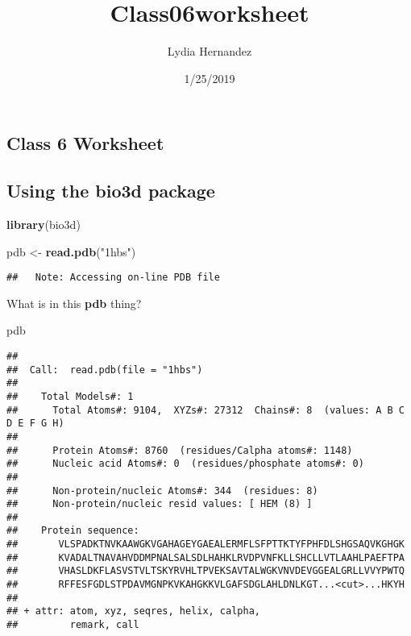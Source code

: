 \documentclass[]{article}
\title{Class06worksheet}
\author{Lydia Hernandez}
\date{1/25/2019}
\newenvironment{Shaded}{\begin{snugshade}}{\end{snugshade}}
\newcommand{\KeywordTok}[1]{\textcolor[rgb]{0.13,0.29,0.53}{\textbf{#1}}}
\newcommand{\StringTok}[1]{\textcolor[rgb]{0.31,0.60,0.02}{#1}}
\newcommand{\NormalTok}[1]{#1}
\begin{document}
\maketitle

\subsection{Class 6 Worksheet}\label{class-6-worksheet}

\subsection{Using the bio3d package}\label{using-the-bio3d-package}

\begin{Shaded}
\begin{Highlighting}[]
\KeywordTok{library}\NormalTok{(bio3d)}
\end{Highlighting}
\end{Shaded}

\begin{Shaded}
\begin{Highlighting}[]
\NormalTok{pdb <-}\StringTok{ }\KeywordTok{read.pdb}\NormalTok{(}\StringTok{"1hbs"}\NormalTok{)}
\end{Highlighting}
\end{Shaded}

\begin{verbatim}
##   Note: Accessing on-line PDB file
\end{verbatim}

What is in this \textbf{pdb} thing?

\begin{Shaded}
\begin{Highlighting}[]
\NormalTok{pdb}
\end{Highlighting}
\end{Shaded}

\begin{verbatim}
## 
##  Call:  read.pdb(file = "1hbs")
## 
##    Total Models#: 1
##      Total Atoms#: 9104,  XYZs#: 27312  Chains#: 8  (values: A B C D E F G H)
## 
##      Protein Atoms#: 8760  (residues/Calpha atoms#: 1148)
##      Nucleic acid Atoms#: 0  (residues/phosphate atoms#: 0)
## 
##      Non-protein/nucleic Atoms#: 344  (residues: 8)
##      Non-protein/nucleic resid values: [ HEM (8) ]
## 
##    Protein sequence:
##       VLSPADKTNVKAAWGKVGAHAGEYGAEALERMFLSFPTTKTYFPHFDLSHGSAQVKGHGK
##       KVADALTNAVAHVDDMPNALSALSDLHAHKLRVDPVNFKLLSHCLLVTLAAHLPAEFTPA
##       VHASLDKFLASVSTVLTSKYRVHLTPVEKSAVTALWGKVNVDEVGGEALGRLLVVYPWTQ
##       RFFESFGDLSTPDAVMGNPKVKAHGKKVLGAFSDGLAHLDNLKGT...<cut>...HKYH
## 
## + attr: atom, xyz, seqres, helix, calpha,
##         remark, call
\end{verbatim}
\end{document}
